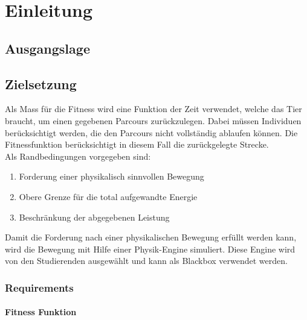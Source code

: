 %
%


\chapter{Einleitung}


\section{Ausgangslage}


\section{Zielsetzung}


  Als Mass für die Fitness wird eine Funktion der Zeit verwendet, welche das Tier braucht,
  um einen gegebenen Parcours zurückzulegen.
  Dabei müssen Individuen berücksichtigt werden, die den Parcours nicht vollständig ablaufen können.
  Die Fitnessfunktion berücksichtigt in diesem Fall die zurückgelegte Strecke.
  \\
  Als Randbedingungen vorgegeben sind:
  \begin{enumerate}
    \item Forderung einer physikalisch sinnvollen Bewegung
    \item Obere Grenze für die total aufgewandte Energie
    \item Beschränkung der abgegebenen Leistung
  \end{enumerate}
  Damit die Forderung nach einer physikalischen Bewegung erfüllt werden kann,
  wird die Bewegung mit Hilfe einer Physik-Engine simuliert.
  Diese Engine wird von den Studierenden ausgewählt und kann als Blackbox verwendet werden.

  \subsection{Requirements}

    \subsubsection{Fitness Funktion}

